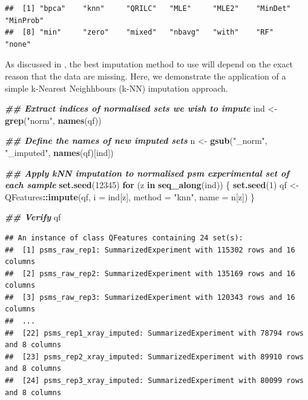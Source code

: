 \documentclass[9pt,a4paper,]{extarticle}
\newenvironment{Shaded}{\begin{snugshade}}{\end{snugshade}}
\newcommand{\AttributeTok}[1]{\textcolor[rgb]{0.13,0.29,0.53}{#1}}
\newcommand{\ControlFlowTok}[1]{\textcolor[rgb]{0.13,0.29,0.53}{\textbf{#1}}}
\newcommand{\DecValTok}[1]{\textcolor[rgb]{0.00,0.00,0.81}{#1}}
\newcommand{\DocumentationTok}[1]{\textcolor[rgb]{0.56,0.35,0.01}{\textbf{\textit{#1}}}}
\newcommand{\FunctionTok}[1]{\textcolor[rgb]{0.13,0.29,0.53}{\textbf{#1}}}
\newcommand{\NormalTok}[1]{#1}
\newcommand{\OtherTok}[1]{\textcolor[rgb]{0.56,0.35,0.01}{#1}}
\newcommand{\SpecialCharTok}[1]{\textcolor[rgb]{0.81,0.36,0.00}{\textbf{#1}}}
\newcommand{\StringTok}[1]{\textcolor[rgb]{0.31,0.60,0.02}{#1}}
\begin{document}
\begin{verbatim}
##  [1] "bpca"    "knn"     "QRILC"   "MLE"     "MLE2"    "MinDet"  "MinProb"
##  [8] "min"     "zero"    "mixed"   "nbavg"   "with"    "RF"      "none"
\end{verbatim}

As discussed in \citet{Hutchings2023}, the best imputation method to use will depend on
the exact reason that the data are missing. Here, we demonstrate the application
of a simple k-Nearest Neighhbours (k-NN) imputation approach.

\begin{Shaded}
\begin{Highlighting}[]
\DocumentationTok{\#\# Extract indices of normalised sets we wish to impute}
\NormalTok{ind }\OtherTok{\textless{}{-}} \FunctionTok{grep}\NormalTok{(}\StringTok{"norm"}\NormalTok{, }\FunctionTok{names}\NormalTok{(qf))}

\DocumentationTok{\#\# Define the names of new imputed sets}
\NormalTok{n }\OtherTok{\textless{}{-}} \FunctionTok{gsub}\NormalTok{(}\StringTok{"\_norm"}\NormalTok{, }\StringTok{"\_imputed"}\NormalTok{, }\FunctionTok{names}\NormalTok{(qf)[ind])}

\DocumentationTok{\#\# Apply kNN imputation to normalised psm experimental set of each sample}
\FunctionTok{set.seed}\NormalTok{(}\DecValTok{12345}\NormalTok{)}
\ControlFlowTok{for}\NormalTok{ (z }\ControlFlowTok{in} \FunctionTok{seq\_along}\NormalTok{(ind)) \{}
  \FunctionTok{set.seed}\NormalTok{(}\DecValTok{1}\NormalTok{)}
\NormalTok{  qf }\OtherTok{\textless{}{-}}\NormalTok{ QFeatures}\SpecialCharTok{::}\FunctionTok{impute}\NormalTok{(qf, }
                          \AttributeTok{i =}\NormalTok{ ind[z], }
                          \AttributeTok{method =} \StringTok{"knn"}\NormalTok{,}
                          \AttributeTok{name =}\NormalTok{ n[z])}
\NormalTok{\}}
\end{Highlighting}
\end{Shaded}

\begin{Shaded}
\begin{Highlighting}[]
\DocumentationTok{\#\# Verify}
\NormalTok{qf}
\end{Highlighting}
\end{Shaded}

\begin{verbatim}
## An instance of class QFeatures containing 24 set(s):
##  [1] psms_raw_rep1: SummarizedExperiment with 115302 rows and 16 columns 
##  [2] psms_raw_rep2: SummarizedExperiment with 135169 rows and 16 columns 
##  [3] psms_raw_rep3: SummarizedExperiment with 120343 rows and 16 columns 
##  ...
##  [22] psms_rep1_xray_imputed: SummarizedExperiment with 78794 rows and 8 columns 
##  [23] psms_rep2_xray_imputed: SummarizedExperiment with 89910 rows and 8 columns 
##  [24] psms_rep3_xray_imputed: SummarizedExperiment with 80099 rows and 8 columns
\end{verbatim}
\end{document}
